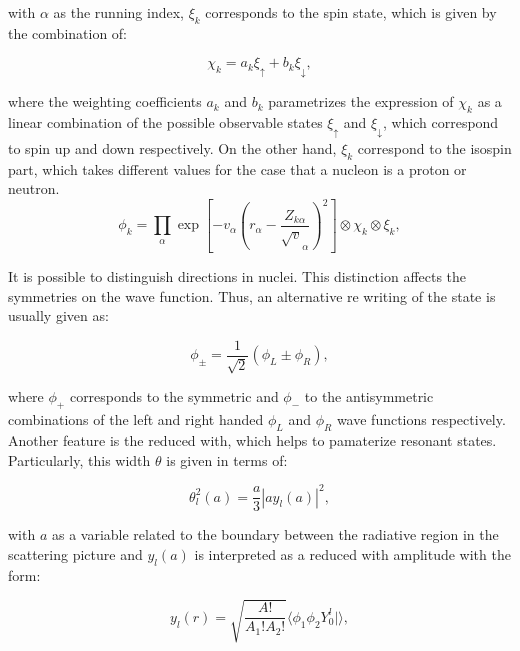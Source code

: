 \documentclass[openany]{book}
\begin{document}
with $\alpha$ as the running index, $\xi_k$ corresponds to the spin state, which is given by the combination of: 

\begin{equation}\label{eq:micro_linearChain_chi}
	\chi_k = a_k \xi_{\uparrow} + b_k \xi_\downarrow,
\end{equation} 

where the weighting coefficients $ a_k$ and $b_k $ parametrizes the expression of $\chi_k$ as a linear combination of the possible observable states $\xi_{\uparrow}  $ and $\xi_\downarrow$, which correspond to spin up and down respectively. On the other hand, $\xi_k$ correspond to the isospin part, which takes different values for the case that a nucleon is a proton or neutron. \\

\begin{equation}\label{eq:micro_linearChain}
	\phi_k = \prod_{\alpha} {\exp \left [- v_\alpha \left ( r_\alpha - \frac{Z_{k\alpha}}{\sqrt v_\alpha} \right )^2 \right]} \otimes \chi_k \otimes \xi_k,
\end{equation} 

It is possible to distinguish directions in nuclei. This distinction affects the symmetries on the wave function. Thus, an alternative re writing of the state is usually given as: 

\begin{equation}\label{eq:micro_linearChain_2state}
	\phi_\pm = \frac{1}{\sqrt{2}} (\phi_L \pm \phi_R),
\end{equation} 

where $\phi_+$ corresponds to the symmetric and $\phi_-$ to the antisymmetric combinations of the left and right handed $\phi_L$ and $\phi_R$ wave functions respectively.  \\

Another feature is the reduced with, which helps to pamaterize resonant states. Particularly, this width $\theta$ is given in terms of: 

\begin{equation}\label{eq:micro_linearChain_width}
	\theta^2_l (a) = \frac{a}{3} |a y_l(a)|^2,
\end{equation} 

with $a$ as a variable related to the boundary between the radiative region in the scattering picture and $y_l(a)$ is interpreted as a reduced with amplitude with the form: 

\begin{equation}\label{eq:micro_linearChain_widthAmplitude}
	y_l(r) = \sqrt{\frac{A!}{A_1!A_2! }} \langle \phi_1 \phi_2 Y^l_{0}| \rangle, 
\end{equation} 
\end{document}
